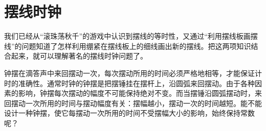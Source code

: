 \section{摆线时钟}

我们已经从“滚珠荡秋千”的游戏中认识到摆线的等时性，又通过“利用摆线板画摆线”的问题知道了怎样利用绷紧在摆线板上的细线画出新的摆线。把这两项知识结合起来，就可以理解著名的摆线时钟问题了。

钟摆在滴答声中来回摆动一次，每次摆动所用的时间必须严格地相等，才能保证计时的准确性。通常时钟的钟摆是把摆锤挂在摆杆上，沿圆弧来回摆动。由于各种因素的影响，钟摆每次摆动的幅度不可能保持绝对不变。而当摆锤沿圆弧摆动时，来回摆动一次所用的时间与摆动幅度有关：摆幅越小，摆动一次的时间越短。能不能设计一种钟摆，使它每摆动一次所用的时间不受摆幅大小的影响，始终保持常数呢？


